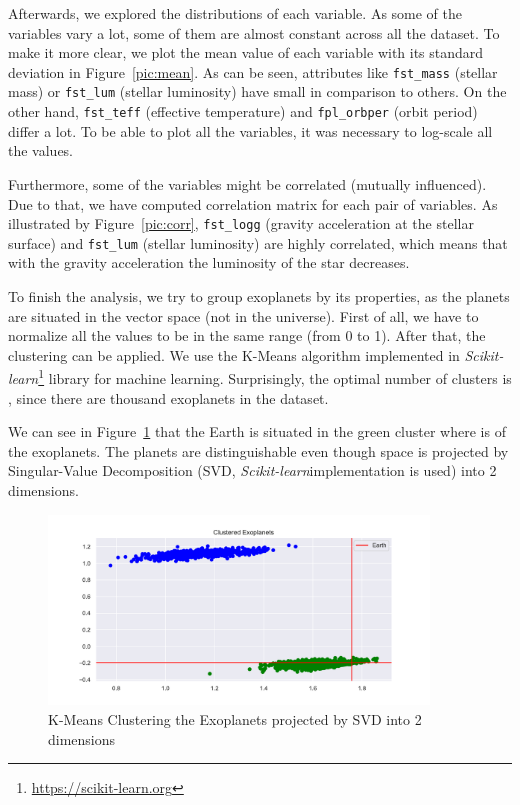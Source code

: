 \documentclass[12p]{article}
\begin{document}
Afterwards, we explored the distributions of each variable. As some of the variables vary a lot, some of them are almost constant across all the dataset. To make it more clear, we plot the mean value of each variable with its standard deviation in Figure~\ref{pic:mean}. As can be seen, attributes like \verb|fst_mass| (stellar mass) or \verb|fst_lum| (stellar luminosity) have small in comparison to others. On the other hand, \verb|fst_teff| (effective temperature) and \verb|fpl_orbper| (orbit period) differ a lot. To be able to plot all the variables, it was necessary to log-scale all the values. 

Furthermore, some of the variables might be correlated (mutually influenced). Due to that, we have computed correlation matrix for each pair of variables. As illustrated by Figure~\ref{pic:corr}, \verb|fst_logg| (gravity acceleration at the stellar surface) and \verb|fst_lum| (stellar luminosity) are highly correlated, which means that with the gravity acceleration the luminosity of the star decreases.

To finish the analysis, we try to group exoplanets by its properties, as the planets are situated in the vector space (not in the universe). First of all, we have to normalize all the values to be in the same range (from 0 to 1). After that, the clustering can be applied. We use the K-Means algorithm implemented in \textit{Scikit-learn}\footnote{\url{https://scikit-learn.org}} library for machine learning. Surprisingly, the optimal number of clusters is , since there are  thousand exoplanets in the dataset.

We can see in Figure~\ref{pic:cluster} that the Earth is situated in the green cluster where is  of the exoplanets. The planets are distinguishable even though space is projected by Singular-Value Decomposition (SVD, \textit{Scikit-learn}\footnotemark[\value{footnote}] implementation is used) into 2 dimensions.

\begin{figure}\centering
    \includegraphics[width=0.9\textwidth]{graphics/cluster.pdf}
    \caption{K-Means Clustering the Exoplanets projected by SVD into 2 dimensions}
    \label{pic:cluster}
\end{figure}
\end{document}
